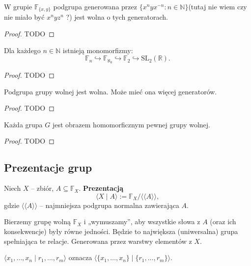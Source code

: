 \begin{theorem}
    W grupie $\mathbb{F}_{\{x,y\}}$ podgrupa generowana przez $\{x^n y x^{-n} : n \in \mathbb{N}\}$(tutaj nie wiem czy nie miało być $x^{n}yz^{n}  $ ?) jest wolna o tych generatorach.
\end{theorem}
\begin{proof}
    TODO
\end{proof} 

\begin{corollary}
    Dla każdego $n \in \mathbb{N}$ istnieją monomorfizmy:
    \[
    \mathbb{F}_n \hookrightarrow \mathbb{F}_{\aleph_0} \hookrightarrow \mathbb{F}_2 \hookrightarrow \mathrm{SL}_2(\mathbb{R}).
    \]
\end{corollary}
\begin{proof}
    TODO
\end{proof} 
\begin{theorem}
    Podgrupa grupy wolnej jest wolna. Może mieć ona więcej generatorów.
\end{theorem}
\begin{proof}
    TODO
\end{proof} 
\begin{fact}
    Każda grupa $G$ jest obrazem homomorficznym pewnej grupy wolnej.
\end{fact}
\begin{proof}
    TODO
\end{proof} 
\subsection*{Prezentacje grup}

\begin{definition}[Prezentacja]
    Niech $X$ – zbiór, $A \subseteq \mathbb{F}_X$. \textbf{Prezentacją}
    \[
    \langle X \mid A \rangle := \mathbb{F}_X / \langle\!\langle A \rangle\!\rangle,
    \]
    gdzie $\langle\!\langle A \rangle\!\rangle$ – najmniejsza podgrupa normalna zawierająca $A$.
\end{definition}

\begin{intuition}
    Bierzemy grupę wolną $\mathbb{F}_X$ i „wymuszamy”, aby wszystkie słowa z $A$ (oraz ich konsekwencje) były równe jedności. Będzie to największa (uniwersalna) grupa spełniająca te relacje. Generowana przez warstwy elementów z $X$. 
\end{intuition}

\begin{remark}[Notacja]
    $\langle x_1,\dots,x_n \mid r_1,\dots,r_m \rangle$ oznacza $\langle \{x_1,\dots,x_n\} \mid \{r_1,\dots,r_m\} \rangle$.
\end{remark}


